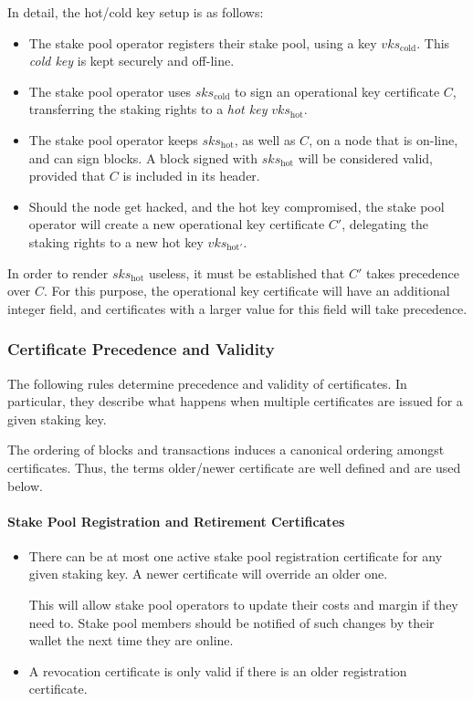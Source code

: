 \documentclass[11pt,a4paper]{article}
\begin{document}
In detail, the hot/cold key setup is as follows:

\begin{itemize}
\item
  The stake pool operator registers their stake pool, using a key
  \(vks_\text{cold}\). This \emph{cold key} is kept securely and
  off-line.
\item The stake pool operator uses \(sks_\text{cold}\)
  to sign an operational key certificate \(C\),
  transferring the staking rights to a \emph{hot key}
  \(vks_\text{hot}\).
\item
  The stake pool operator keeps \(sks_\text{hot}\), as well as \(C\), on
  a node that is on-line, and can sign blocks. A block signed with
  \(sks_\text{hot}\) will be considered valid, provided that \(C\) is
  included in its header.
\item
  Should the node get hacked, and the hot key compromised, the stake
  pool operator will create a new operational key certificate
  \(C'\), delegating the staking rights to a new hot key
  \(vks_{\text{hot}'}\).
\end{itemize}

In order to render \(sks_\text{hot}\) useless, it must be established
that \(C'\) takes precedence over \(C\). For this purpose, the
operational key certificate will have an additional integer
field, and certificates with a larger value for this field will take
precedence.

\subsubsection{Certificate Precedence and Validity}
\label{certificate-precedence-and-validity}

The following rules determine precedence and validity of certificates.
In particular, they describe what happens when multiple certificates are
issued for a given staking key.

The ordering of blocks and transactions induces a canonical ordering
amongst certificates. Thus, the terms older/newer certificate are well
defined and are used below.

\paragraph{Stake Pool Registration and Retirement Certificates}
\label{stake-pool-registration-and-retirement-certificates}

\begin{itemize}
\item
  There can be at most one active stake pool registration certificate
  for any given staking key. A newer certificate will override an older
  one.

  This will allow stake pool operators to update their costs and margin
  if they need to. Stake pool members should be notified of such changes
  by their wallet the next time they are online.
\item
  A revocation certificate is only valid if there is an older
  registration certificate.
\end{itemize}
\end{document}
